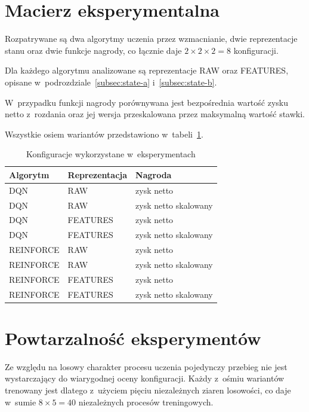 \section{Macierz eksperymentalna}

Rozpatrywane są dwa algorytmy uczenia przez
wzmacnianie, dwie reprezentacje stanu oraz dwie funkcje nagrody, co
łącznie daje $2 \times 2 \times 2 = 8$ konfiguracji.

Dla każdego algorytmu analizowane są reprezentacje RAW oraz FEATURES,
opisane w~podrozdziale~\ref{subsec:state-a} i~\ref{subsec:state-b}.

W~przypadku funkcji nagrody porównywana jest bezpośrednia wartość zysku
netto z~rozdania oraz jej wersja przeskalowana przez maksymalną
wartość stawki.

Wszystkie osiem wariantów przedstawiono w~tabeli~\ref{tab:experiment-configurations}.

\begin{table}[ht]
    \centering
    \caption{Konfiguracje wykorzystane w~eksperymentach}
    \label{tab:experiment-configurations}
    \begin{tabular}{lll}
        \hline
        Algorytm & Reprezentacja & Nagroda \\
        \hline
        DQN & RAW & zysk netto \\
        DQN & RAW & zysk netto skalowany \\
        DQN & FEATURES & zysk netto \\
        DQN & FEATURES & zysk netto skalowany \\
        REINFORCE & RAW & zysk netto \\
        REINFORCE & RAW & zysk netto skalowany \\
        REINFORCE & FEATURES & zysk netto \\
        REINFORCE & FEATURES & zysk netto skalowany \\
        \hline
    \end{tabular}
\end{table}

\section{Powtarzalność eksperymentów}

Ze względu na losowy charakter procesu uczenia pojedynczy przebieg nie
jest wystarczający do wiarygodnej oceny konfiguracji. Każdy z~ośmiu
wariantów trenowany jest dlatego z~użyciem pięciu niezależnych ziaren
losowości, co daje w~sumie $8 \times 5 = 40$ niezależnych procesów
treningowych.

